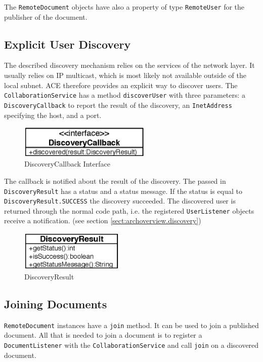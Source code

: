 The \texttt{Remote\-Document} objects have also a property of type
\texttt{Remote\-User} for the publisher of the document.


\subsection{Explicit User Discovery}
The described discovery mechanism relies on the services of the network layer.
It usually relies on IP multicast, which is most likely not available outside
of the local subnet. ACE therefore provides an explicit way to discover users.
The \texttt{Collaboration\-Service} has a method \texttt{discover\-User} with
three parameters: a \texttt{Discovery\-Callback} to report the result
of the discovery, an \texttt{Inet\-Address} specifying the host, and a port.

\begin{figure}[H]
 \centering
 \includegraphics[width=6.28cm,height=1.55cm]{../images/finalreport/architecture_discoverycallback_uml.eps}
 \caption{DiscoveryCallback Interface}
\end{figure}

The callback is notified about the result of the discovery. The passed in
\texttt{Discovery\-Result} has a status and a status message. If the status
is equal to \texttt{Discovery\-Result.\-SUCCESS} the discovery succeeded. The
discovered user is returned through the normal code path, i.e. the
registered \texttt{User\-Listener} objects receive a notification. (see
section \ref{sect:archoverview.discovery})

\begin{figure}[H]
 \centering
 \includegraphics[width=4.94cm,height=1.91cm]{../images/finalreport/architecture_discoveryresult_uml.eps}
 \caption{DiscoveryResult}
\end{figure}


\subsection{Joining Documents}
\label{sect:archoverview.join}
\texttt{Remote\-Document} instances have a \texttt{join} method. It
can be used to join a published document. All that is needed to
join a document is to register a \texttt{Document\-Listener} with the 
\texttt{Collaboration\-Service} and call \texttt{join} on a discovered document.

